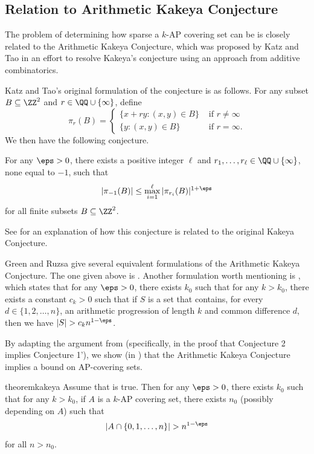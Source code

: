 \documentclass[11pt,reqno]{amsart}
\begin{document}
\subsection{Relation to Arithmetic Kakeya Conjecture}
\label{subsec:relation}
The problem of determining how sparse
a $k$-AP covering set can be is closely related to 
the Arithmetic Kakeya Conjecture,
which was proposed by Katz and Tao 
\cite{katz_tao} in an effort to resolve Kakeya's conjecture 
using an approach from additive combinatorics.

Katz and Tao's original formulation of the conjecture is as follows.
For any subset $B\subseteq \ZZ^2$ and $r\in\QQ\cup\{\infty\}$, define 
$$\pi_r(B) = \begin{cases}
\{x+ry : (x,y)\in B\} &  \text{ if } r\neq\infty \\
\{y : (x,y)\in B\} & \text{ if } r=\infty.
\end{cases}$$
We then have the following conjecture.
\begin{conjecture}
\label{conj:arithmetic_kakeya}
For any $\eps>0$, there exists a positive integer $\ell$ and 
$r_1,\dots,r_\ell\in\QQ\cup\{\infty\}$, none equal to $-1$, 
such that 
$$|\pi_{-1}(B)| \leq \max_{i=1}^\ell |\pi_{r_i}(B)|^{1+\eps}$$
for all finite subsets $B\subseteq \ZZ^2$.
\end{conjecture}
See \cite{needles} for an explanation of how this conjecture 
is related to the original Kakeya Conjecture.

Green and Ruzsa \cite[Thm.~1.1]{arithmetic_kakeya} give several 
equivalent formulations of the Arithmetic Kakeya Conjecture.
The one given above is \cite[Conj.~3]{arithmetic_kakeya}.
Another formulation worth mentioning is \cite[Conj.~1]{arithmetic_kakeya}, which 
states that for any $\eps>0$, there exists $k_0$ such that 
for any $k > k_0$, there exists 
a constant $c_k>0$ such that if $S$ is a set that contains,
for every $d\in\{1,2,\dots,n\}$, 
an arithmetic progression of length $k$ and common 
difference $d$,
then we have $|S| > c_kn^{1-\eps}$.

By adapting the argument from \cite[\S 2]{arithmetic_kakeya}
(specifically, in the proof that Conjecture 2 implies 
Conjecture 1'), we show (in ) 
that the Arithmetic Kakeya Conjecture implies a bound on AP-covering sets.
\begin{restatable}{theorem}{kakeya}
\label{thm:arithmetic_kakeya}
Assume that  is true.
Then for any $\eps>0$, there exists $k_0$ such that 
for any $k>k_0$, if $A$ is a $k$-AP covering set,
there exists $n_0$ (possibly depending on $A$) such that
$$|A\cap \{0,1,\dots,n\}| > n^ {1-\eps}$$
for all $n>n_0$.
\end{restatable}
\end{document}
